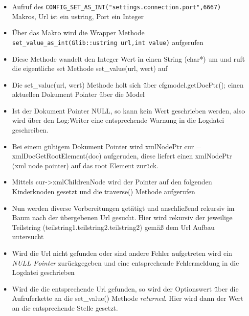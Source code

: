 \begin{itemize}

    \item Aufruf des \verb+CONFIG_SET_AS_INT("settings.connection.port",6667)+ Makros, Url ist ein ustring, Port ein Integer
    \item Über das Makro wird die Wrapper Methode \verb+set_value_as_int(Glib::ustring url,int value)+ aufgerufen
    \item Diese Methode wandelt den Integer Wert in einen String (char*) um und ruft die eigentliche set Methode 
          set\_value(url, wert) auf
    \item Die set\_value(url, wert) Methode holt sich über cfgmodel.getDocPtr(); einen aktuellen Dokument Pointer über die Model
    \item Ist der Dokument Pointer NULL, so kann kein Wert geschrieben werden, also wird über den Log:Writer
          eine entsprechende Warnung in die Logdatei geschreiben.
    \item Bei einem gültigem Dokument Pointer wird  xmlNodePtr cur = xmlDocGetRootElement(doc) aufgeruden,
          diese liefert einen xmlNodePtr (xml node pointer) auf das root Element zurück.
    \item Mittels cur->xmlChildrenNode wird der Pointer auf den folgenden Kinderknoden gesetzt und die traverse() Methode aufgerufen
     \item Nun werden diverse Vorbereitungen getätigt und anschließend rekursiv im Baum nach der übergebenen Url gesucht. Hier wird rekursiv
     der jeweilige Teilstring (teilstring1.teilstring2.teilstring2) gemäß dem Url Aufbau untersucht
           
     \item Wird die Url nicht gefunden oder sind andere Fehler aufgetreten wird ein \emph{NULL Pointer} zurückgegeben
                  und eine entsprechende Fehlermeldung in die Logdatei geschrieben
     \item Wird die die entsprechende Url gefunden, so wird der Optionswert über die Aufruferkette an die set\_value() Methode \emph{returned}.
     Hier wird dann der Wert an die entsprechende Stelle gesetzt.  
\end{itemize}


